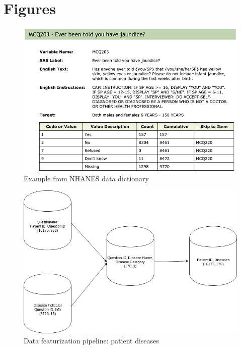 \documentclass[runningheads]{llncs}
\begin{document}
\clearpage

\appendix

\section{Figures}
 \begin{figure}[H]
\centering
\includegraphics[width=\textwidth,keepaspectratio]{figs/image0copy.png}
\caption{Example from NHANES data dictionary}
\label{fig:image_0}
\end{figure}

\begin{figure}[H]
\includegraphics[width=\textwidth,keepaspectratio]{figs/image9.png}
\caption{Data featurization pipeline: patient diseases}
\label{fig:image_9}
\centering
\end{figure}
\end{document}
